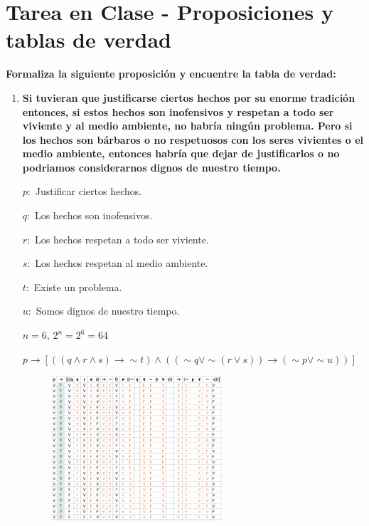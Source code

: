 \documentclass[12pt]{article}
\begin{document}
    
  
    \section*{\centering Tarea en Clase - Proposiciones y tablas de verdad}
        \textbf{Formaliza la siguiente proposición y encuentre la tabla de verdad:}

        \begin{enumerate}
            \item \textbf{Si tuvieran que justificarse ciertos hechos por su enorme tradición entonces, si estos hechos son inofensivos y respetan a todo ser viviente y al medio ambiente, no habría ningún problema. Pero si los hechos son bárbaros o no respetuosos con los seres vivientes o el medio ambiente, entonces habría que dejar de justificarlos o no podriamos considerarnos dignos de nuestro tiempo.}
                \par$p:$ Justificar ciertos hechos.
                \par$q:$ Los hechos son inofensivos.
                \par$r:$ Los hechos respetan a todo ser viviente.
                \par$s:$ Los hechos respetan al medio ambiente.
                \par$t:$ Existe un problema.
                \par$u:$ Somos dignos de nuestro tiempo.
                \par$n = 6$, $2^n = 2^6 = 64$
                \par\vspace{0.5cm}$p \longrightarrow [((q \wedge r \wedge s) \longrightarrow \sim t) \wedge ((\sim q \vee \sim (r \vee s)) \longrightarrow (\sim p \vee \sim u))]$

            
                \begin{figure}[!h]
                    \centering
                    \includegraphics[width=0.6\textwidth]{Img/Tarea5_ej1_1.png}
                \end{figure}


\end{enumerate}
\end{document}
